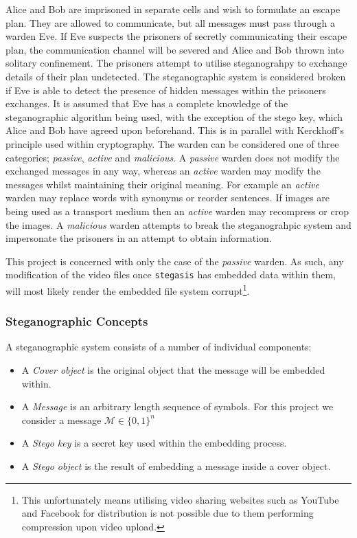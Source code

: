 \documentclass[paper=a4, fontsize=11pt,twoside]{scrartcl}    %
\begin{document}
Alice and Bob are imprisoned in separate cells and wish to formulate an escape plan. They are allowed to communicate, but all messages must pass through a warden Eve. If Eve suspects the prisoners of secretly communicating their escape plan, the communication channel will be severed and Alice and Bob thrown into solitary confinement. The prisoners attempt to utilise steganograhpy to exchange details of their plan undetected. The steganographic system is considered broken if Eve is able to detect the presence of hidden messages within the prisoners exchanges. It is assumed that Eve has a complete knowledge of the steganographic algorithm being used, with the exception of the stego key, which Alice and Bob have agreed upon beforehand. This is in parallel with Kerckhoff's principle used within cryptography. The warden can be considered one of three categories; \textit{passive}, \textit{active} and \textit{malicious}. A \textit{passive} warden does not modify the exchanged messages in any way, whereas an \textit{active} warden may modify the messages whilst maintaining their original meaning. For example an \textit{active} warden may replace words with synonyms or reorder sentences. If images are being used as a transport medium then an \textit{active} warden may recompress or crop the images. A \textit{malicious} warden attempts to break the steganograhpic system and impersonate the prisoners in an attempt to obtain information.

This project is concerned with only the case of the \textit{passive} warden. As such, any modification of the video files once \texttt{stegasis} has embedded data within them, will most likely render the embedded file system corrupt\footnote{This unfortunately means utilising video sharing websites such as YouTube and Facebook for distribution is not possible due to them performing compression upon video upload.}.


\subsubsection{Steganographic Concepts}
A steganographic system consists of a number of individual components:
\begin{itemize}
	\item A \textit{Cover object} is the original object that the message will be embedded within.
	\item A \textit{Message} is an arbitrary length sequence of symbols. For this project we consider a message $\mathcal{M} \in \{0,1\}^{n} $
	\item A \textit{Stego key} is a secret key used within the embedding process.
	\item A \textit{Stego object} is the result of embedding a message inside a cover object.
\end{itemize}
\end{document}
